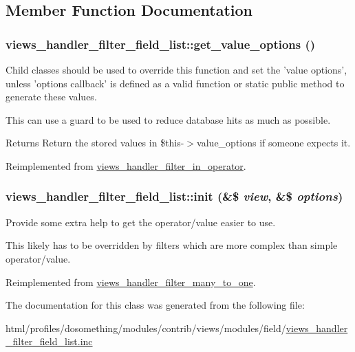 \subsection{Member Function Documentation}
\hypertarget{classviews__handler__filter__field__list_aa3c5646f92d230f6c9ac61d483ee60aa}{
\subsubsection[{get\_\-value\_\-options}]{\setlength{\rightskip}{0pt plus 5cm}views\_\-handler\_\-filter\_\-field\_\-list::get\_\-value\_\-options ()}}
\label{classviews__handler__filter__field__list_aa3c5646f92d230f6c9ac61d483ee60aa}
Child classes should be used to override this function and set the 'value options', unless 'options callback' is defined as a valid function or static public method to generate these values.

This can use a guard to be used to reduce database hits as much as possible.

\begin{DoxyReturn}{Returns}
Return the stored values in \$this-\/$>$value\_\-options if someone expects it. 
\end{DoxyReturn}


Reimplemented from \hyperlink{classviews__handler__filter__in__operator_aa5b5df6d90f4359ed28c0c446bdc81a6}{views\_\-handler\_\-filter\_\-in\_\-operator}.\hypertarget{classviews__handler__filter__field__list_a0c04261667d87e0a74c2036a6a62ee75}{
\subsubsection[{init}]{\setlength{\rightskip}{0pt plus 5cm}views\_\-handler\_\-filter\_\-field\_\-list::init (\&\$ {\em view}, \/  \&\$ {\em options})}}
\label{classviews__handler__filter__field__list_a0c04261667d87e0a74c2036a6a62ee75}
Provide some extra help to get the operator/value easier to use.

This likely has to be overridden by filters which are more complex than simple operator/value. 

Reimplemented from \hyperlink{classviews__handler__filter__many__to__one_aecb4fb4dbe4f93d157cb8a7b699fea22}{views\_\-handler\_\-filter\_\-many\_\-to\_\-one}.

The documentation for this class was generated from the following file:\begin{DoxyCompactItemize}
\item 
html/profiles/dosomething/modules/contrib/views/modules/field/\hyperlink{views__handler__filter__field__list_8inc}{views\_\-handler\_\-filter\_\-field\_\-list.inc}\end{DoxyCompactItemize}
